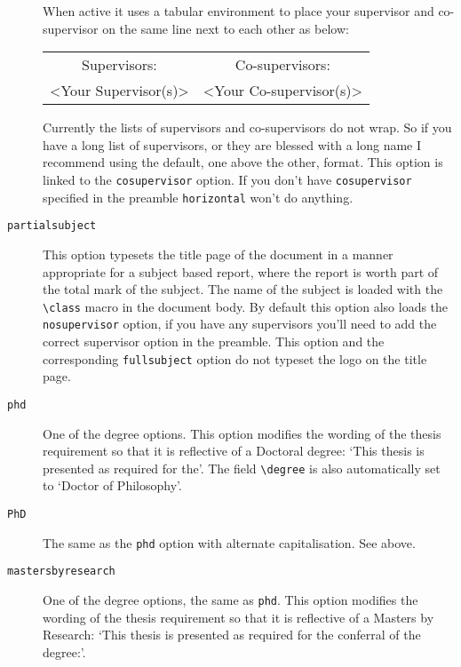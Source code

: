 \documentclass[12pt,oneside]{article}
\newcommand{\option}[1]{\texttt{\color{Green}#1}} %
\newcommand{\command}[1]{\texttt{\color{Red}#1}} %
\begin{document}
\begin{description}
    When active it uses a tabular environment to place your supervisor and co-supervisor on the same line next to each other as below:
    \begin{center}
    \begin{tabular}{cc} 
        Supervisors: & Co-supervisors:\\
        \textless{}Your Supervisor(s)\textgreater & \textless{}Your Co-supervisor(s)\textgreater\\
    \end{tabular}
    \end{center}
    
    Currently the lists of supervisors and co-supervisors do not wrap. So if you have a long list of supervisors, or they are blessed with a long name I recommend using the default, one above the other, format. This option is linked to the \option{cosupervisor} option. If you don't have \option{cosupervisor} specified in the preamble \option{horizontal} won't do anything.
    
    \item[\option{partialsubject}]
    This option typesets the title page of the document in a manner appropriate for a subject based report, where the report is worth part of the total mark of the subject. The name of the subject is loaded with the \command{\textbackslash{}class} macro in the document body. By default this option also loads the \option{nosupervisor} option, if you have any supervisors you'll need to add the correct supervisor option in the preamble. This option and the corresponding \option{fullsubject} option do not typeset the logo on the title page.
    
    \item[\option{phd}]
    One of the degree options. This option modifies the wording of the thesis requirement so that it is reflective of a Doctoral degree: `This thesis is presented as required for the'. The field \command{\textbackslash{}degree} is also automatically set to `Doctor of Philosophy'.

    \item[\option{PhD}]
    The same as the \option{phd} option with alternate capitalisation. See above.
        
    \item[\option{mastersbyresearch}]
    One of the degree options, the same as \option{phd}. This option modifies the wording of the thesis requirement so that it is reflective of a Masters by Research: `This thesis is presented as required for the conferral of the degree:'.
    

\end{description}
\end{document}
